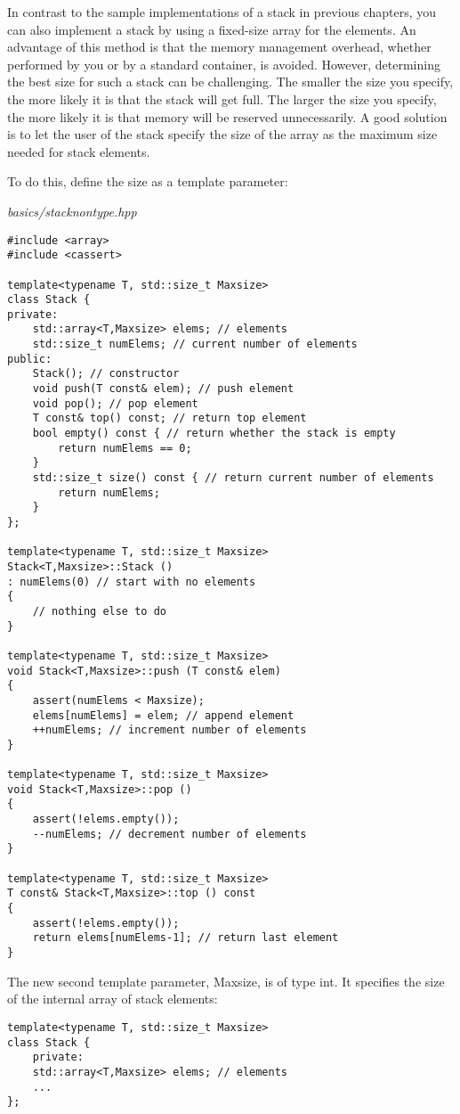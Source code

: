 In contrast to the sample implementations of a stack in previous chapters, you can also implement a stack by using a fixed-size array for the elements. An advantage of this method is that the memory management overhead, whether performed by you or by a standard container, is avoided. However, determining the best size for such a stack can be challenging. The smaller the size you specify, the more likely it is that the stack will get full. The larger the size you specify, the more likely it is that memory will be reserved unnecessarily. A good solution is to let the user of the stack specify the size of the array as the maximum size needed for stack elements.

To do this, define the size as a template parameter:

\noindent
\textit{basics/stacknontype.hpp}
\begin{lstlisting}[style=styleCXX]
#include <array>
#include <cassert>

template<typename T, std::size_t Maxsize>
class Stack {
private:
	std::array<T,Maxsize> elems; // elements
	std::size_t numElems; // current number of elements
public:
	Stack(); // constructor
	void push(T const& elem); // push element
	void pop(); // pop element
	T const& top() const; // return top element
	bool empty() const { // return whether the stack is empty
		return numElems == 0;
	}
	std::size_t size() const { // return current number of elements
		return numElems;
	}
};

template<typename T, std::size_t Maxsize>
Stack<T,Maxsize>::Stack ()
: numElems(0) // start with no elements
{
	// nothing else to do
}

template<typename T, std::size_t Maxsize>
void Stack<T,Maxsize>::push (T const& elem)
{
	assert(numElems < Maxsize);
	elems[numElems] = elem; // append element
	++numElems; // increment number of elements
}

template<typename T, std::size_t Maxsize>
void Stack<T,Maxsize>::pop ()
{
	assert(!elems.empty());
	--numElems; // decrement number of elements
}

template<typename T, std::size_t Maxsize>
T const& Stack<T,Maxsize>::top () const
{
	assert(!elems.empty());
	return elems[numElems-1]; // return last element
}
\end{lstlisting}

The new second template parameter, Maxsize, is of type int. It specifies the size of the internal array of stack elements:

\begin{lstlisting}[style=styleCXX]
template<typename T, std::size_t Maxsize>
class Stack {
	private:
	std::array<T,Maxsize> elems; // elements
	...
};
\end{lstlisting}

